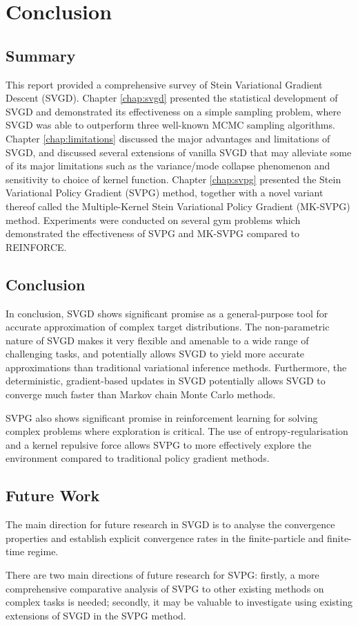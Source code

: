 \chapter{Conclusion}
\label{chap:conclusion}

\section{Summary}

This report provided a comprehensive survey of Stein Variational Gradient Descent (SVGD). Chapter \ref{chap:svgd} presented the statistical development of SVGD and demonstrated its effectiveness on a simple sampling problem, where SVGD was able to outperform three well-known MCMC sampling algorithms. Chapter \ref{chap:limitations} discussed the major advantages and limitations of SVGD, and discussed several extensions of vanilla SVGD that may alleviate some of its major limitations such as the variance/mode collapse phenomenon and sensitivity to choice of kernel function. Chapter \ref{chap:svpg} presented the Stein Variational Policy Gradient (SVPG) method, together with a novel variant thereof called the Multiple-Kernel Stein Variational Policy Gradient (MK-SVPG) method. Experiments were conducted on several gym problems which demonstrated the effectiveness of SVPG and MK-SVPG compared to REINFORCE.

\section{Conclusion}

In conclusion, SVGD shows significant promise as a general-purpose tool for accurate approximation of complex target distributions. The non-parametric nature of SVGD makes it very flexible and amenable to a wide range of challenging tasks, and potentially allows SVGD to yield more accurate approximations than traditional variational inference methods. Furthermore, the deterministic, gradient-based updates in SVGD potentially allows SVGD to converge much faster than Markov chain Monte Carlo methods.

SVPG also shows significant promise in reinforcement learning for solving complex problems where exploration is critical. The use of entropy-regularisation and a kernel repulsive force allows SVPG to more effectively explore the environment compared to traditional policy gradient methods.

\section{Future Work}

The main direction for future research in SVGD is to analyse the convergence properties and establish explicit convergence rates in the finite-particle and finite-time regime.

There are two main directions of future research for SVPG: firstly, a more comprehensive comparative analysis of SVPG to other existing methods on complex tasks is needed; secondly, it may be valuable to investigate using existing extensions of SVGD in the SVPG method.




